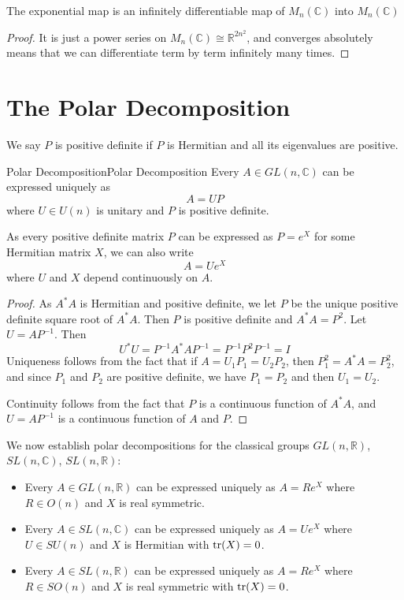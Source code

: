 \documentclass[../main.tex]{subfiles}
\begin{document}
\begin{proposition}{}{}
  The exponential map is an infinitely differentiable map of $M_n(\mathbb{C})$ into $M_n(\mathbb{C})$
\end{proposition}
\begin{proof}
  It is just a power series on $M_n(\mathbb{C}) \cong \mathbb{R}^{2n^2}$, and converges absolutely means that we can differentiate term by term infinitely many times.
\end{proof}

\section{The Polar Decomposition}
We say $P$ is positive definite if $P$ is Hermitian and all its eigenvalues are positive.

\begin{theorem}{Polar Decomposition}{Polar Decomposition}
  Every $A \in GL(n, \mathbb{C})$ can be expressed uniquely as
  \begin{equation}
    A = UP
  \end{equation}
  where $U \in U(n)$ is unitary and $P$ is positive definite.

  As every positive definite matrix $P$ can be expressed as $P = e^X$ for some Hermitian matrix $X$, we can also write
  \begin{equation}
    A = Ue^X
  \end{equation}
  where $U$ and $X$ depend continuously on $A$.
\end{theorem}
\begin{proof}
  As $A^*A$ is Hermitian and positive definite, we let $P$ be the unique positive definite square root of $A^*A$. Then $P$ is positive definite and $A^*A = P^2$. Let $U = AP^{-1}$. Then
  \begin{equation*}
    U^*U = P^{-1}A^*AP^{-1} = P^{-1}P^2P^{-1} = I
  \end{equation*}
  Uniqueness follows from the fact that if $A = U_1P_1 = U_2P_2$, then $P_1^2 = A^*A = P_2^2$, and since $P_1$ and $P_2$ are positive definite, we have $P_1 = P_2$ and then $U_1 = U_2$.

  Continuity follows from the fact that $P$ is a continuous function of $A^*A$, and $U = AP^{-1}$ is a continuous function of $A$ and $P$.
\end{proof}

We now establish polar decompositions for the classical groups $GL(n, \mathbb{R})$, $SL(n, \mathbb{C})$, $SL(n, \mathbb{R})$:
\begin{proposition}{}{}
  \begin{itemize}
    \item Every $A \in GL(n, \mathbb{R})$ can be expressed uniquely as $A = Re^X$ where $R \in O(n)$ and $X$ is real symmetric.
    \item Every $A \in SL(n, \mathbb{C})$ can be expressed uniquely as $A = Ue^X$ where $U \in SU(n)$ and $X$ is Hermitian with $\operatorname{tr}(X) = 0$.
    \item Every $A \in SL(n, \mathbb{R})$ can be expressed uniquely as $A = Re^X$ where $R \in SO(n)$ and $X$ is real symmetric with $\operatorname{tr}(X) = 0$.
  \end{itemize}
\end{proposition}
\end{document}
